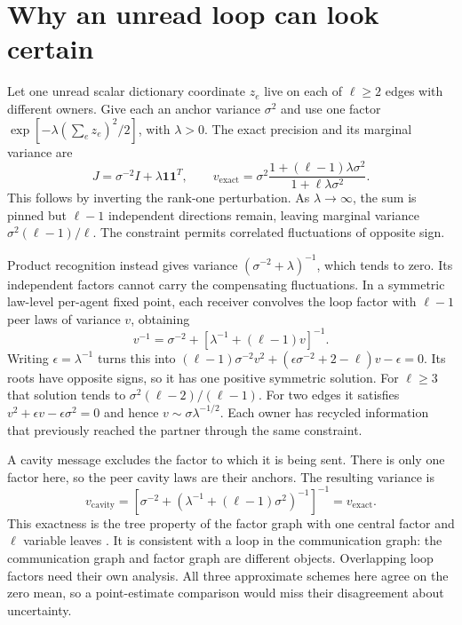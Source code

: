 \section{Why an unread loop can look certain}

Let one unread scalar dictionary coordinate $z_e$ live on each of $\ell\geq2$ edges with different owners. Give each an anchor variance $\sigma^2$ and use one factor $\exp[-\lambda(\sum_ez_e)^2/2]$, with $\lambda>0$. The exact precision and its marginal variance are
\begin{equation}
 J=\sigma^{-2}I+\lambda\mathbf1\mathbf1^T,
 \qquad
 v_{\mathrm{exact}}=\sigma^2\frac{1+(\ell-1)\lambda\sigma^2}
                                      {1+\ell\lambda\sigma^2}.
 \label{c18:loop-exact}
\end{equation}
This follows by inverting the rank-one perturbation. As $\lambda\to\infty$, the sum is pinned but $\ell-1$ independent directions remain, leaving marginal variance $\sigma^2(\ell-1)/\ell$. The constraint permits correlated fluctuations of opposite sign.

Product recognition instead gives variance $(\sigma^{-2}+\lambda)^{-1}$, which tends to zero. Its independent factors cannot carry the compensating fluctuations. In a symmetric law-level per-agent fixed point, each receiver convolves the loop factor with $\ell-1$ peer laws of variance $v$, obtaining
\begin{equation}
 v^{-1}=\sigma^{-2}+[\lambda^{-1}+(\ell-1)v]^{-1}.
 \label{c18:echo}
\end{equation}
Writing $\epsilon=\lambda^{-1}$ turns this into
$(\ell-1)\sigma^{-2}v^2+(\epsilon\sigma^{-2}+2-\ell)v-\epsilon=0$.
Its roots have opposite signs, so it has one positive symmetric solution. For $\ell\geq3$ that solution tends to $\sigma^2(\ell-2)/(\ell-1)$. For two edges it satisfies $v^2+\epsilon v-\epsilon\sigma^2=0$ and hence $v\sim\sigma\lambda^{-1/2}$. Each owner has recycled information that previously reached the partner through the same constraint.

A cavity message excludes the factor to which it is being sent. There is only one factor here, so the peer cavity laws are their anchors. The resulting variance is
\begin{equation}
 v_{\mathrm{cavity}}
 =\left[\sigma^{-2}+(\lambda^{-1}+(\ell-1)\sigma^2)^{-1}\right]^{-1}
 =v_{\mathrm{exact}}.
 \label{c18:cavity}
\end{equation}
This exactness is the tree property of the factor graph with one central factor and $\ell$ variable leaves \citep{Pearl1988}. It is consistent with a loop in the communication graph: the communication graph and factor graph are different objects. Overlapping loop factors need their own analysis. All three approximate schemes here agree on the zero mean, so a point-estimate comparison would miss their disagreement about uncertainty.

